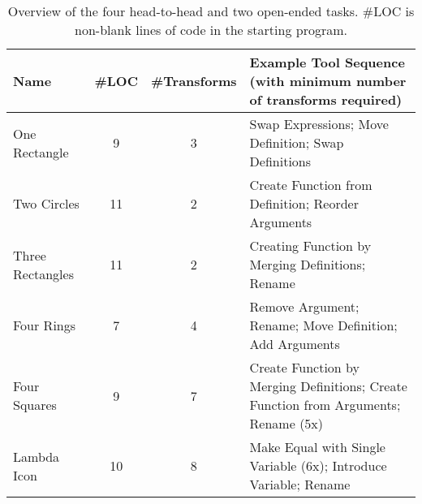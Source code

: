 \begin{table*}
  \caption{Overview of the four head-to-head and two open-ended tasks.
  \#LOC is non-blank lines of code in the starting program.
  }
  \label{tab:tasks}
  \small
  \begin{tabular}{lccl}
    \toprule
    Name & \#LOC & \#Transforms &
    Example Tool Sequence (with minimum number of transforms required)\\
    \midrule
    One Rectangle & 9 & 3 & Swap Expressions; Move Definition; Swap Definitions\\
    Two Circles & 11 & 2 & Create Function from Definition; Reorder Arguments\\
    Three Rectangles & 11 & 2 & Creating Function by Merging Definitions; Rename\\
    Four Rings & 7 & 4 & Remove Argument; Rename; Move Definition; Add Arguments\\
    \midrule
    Four Squares & 9 & 7 & Create Function by Merging Definitions; Create Function from Arguments; Rename (5x)\\
    Lambda Icon & 10 & 8 & Make Equal with Single Variable (6x); Introduce Variable; Rename\\
    \bottomrule
  \end{tabular}
\end{table*}

